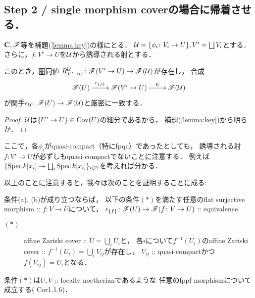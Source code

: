 \documentclass[a4paper, dvipdfmx]{jsarticle}
\begin{document}

\subsection{Step 2 / single morphism coverの場合に帰着させる．}
    \begin{Cor}
        $\mathbf{C}, \mathscr{F}$等を補題(\ref{lemma:key})の様にとる．
        $\mathcal{U}=\{\phi_i \colon V_i \to U\}, V'=\bigsqcup V_i$とする．
        さらに，$f \colon V' \to U$を$\mathcal{U}$から誘導される射とする．

        このとき，圏同値 $R_{V' \to U}^{\mathcal{U}} \colon \mathscr{F}(V' \to U) \to \mathscr{F}(\mathcal{U})$が存在し，
        合成
        \[\xymatrix{
            \fibF(U) \ar[r]^-{\epsilon_{\{f\}}}& \fibF(V' \to U) \ar[r]^-{E}& \fibF(\covU)
        }\]
        が関手$\epsilon_{\mathcal{U}} \colon \mathscr{F}(U) \to \mathscr{F}(\mathcal{U})$と厳密に一致する．
    \end{Cor}
    \begin{proof}
        $\mathcal{U}$は$\{U' \to U\} \in \operatorname{Cov}(U)$の細分であるから，
        補題(\ref{lemma:key})から明らか．
    \end{proof}

    \begin{Remark}
        ここで，各$\phi_i$がquasi-compact（特にfpqc）であったとしても，
        誘導される射$f \colon V' \to U$が必ずしもquasi-compactでないことに注意する．
        例えば$\{\operatorname{Spec} k[x_i] \to \bigsqcup_i \operatorname{Spec} k[x_i]\}_{i \in \mathbb{N}}$を考えれば分かる．

        以上のことに注意すると，我々は次のことを証明することに成る:
        \begin{Claim}
            条件(a), (b)が成り立つならば，
            以下の条件$(*)$を満たす任意のflat surjective morphism :: $f \colon V \to U$について，
            $\epsilon_{\{f\}} \colon \mathscr{F}(U) \to \mathscr{F}(f \colon V \to U)$ :: equivalence.
            \begin{description}
                \item[$(*)$]
                    affine Zariski cover :: $U=\bigcup_i U_i$と，
                    各$i$について$f^{-1}(U_i)$のaffine Zariski cover :: $f^{-1}(U_i)=\bigcup_i V_{ij}$が存在し，
                    $V_{ij}$ :: quasi-compactかつ$f(V_{ij})=U_i$となる．
            \end{description}
        \end{Claim}
        条件$(*)$は$U, V$ :: locally noetherianであるような
        任意のfppf morphismについて成立する(\cite{ASS} Cor1.1.6)．
    \end{Remark}
\end{document}
